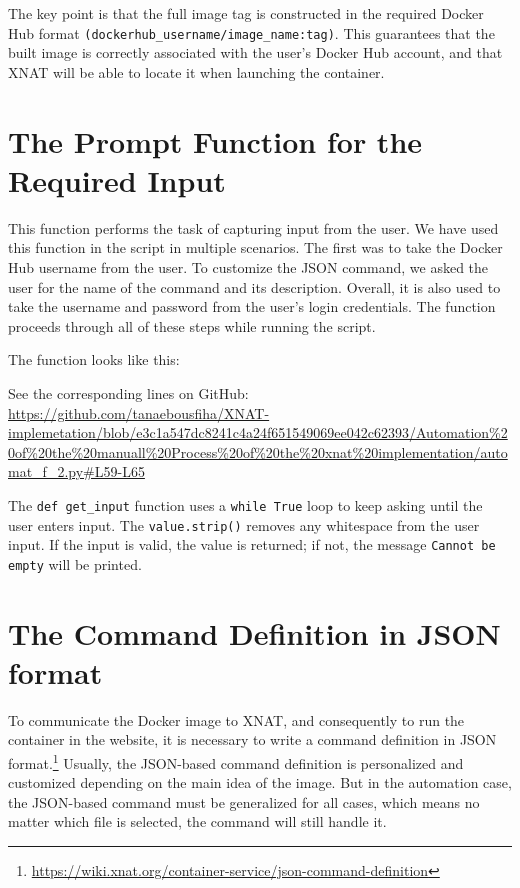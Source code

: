 The key point is that the full image tag is constructed in the required Docker Hub format \texttt{(dockerhub\_username/image\_name:tag)}. This guarantees that the built image is correctly associated with the user’s Docker Hub account, and that XNAT will be able to locate it when launching the container.

\section{The Prompt Function for the Required Input}

This function performs the task of capturing input from the user.
We have used this function in the script in multiple scenarios. The first was to take the Docker Hub username from the user. To customize the JSON command, we asked the user for the name of the command and its description. Overall, it is also used to take the username and password from the user’s login credentials. The function proceeds through all of these steps while running the script.

The function looks like this:
 


\noindent\footnotesize See the corresponding lines on GitHub:\url{ https://github.com/tanaebousfiha/XNAT-implemetation/blob/e3c1a547dc8241c4a24f651549069ee042c62393/Automation%20of%20the%20manuall%20Process%20of%20the%20xnat%20implementation/automat_f_2.py#L59-L65}


The \texttt{def get\_input} function uses a \texttt{while True} loop to keep asking until the user enters input. The \texttt{value.strip()} removes any whitespace from the user input. If the input is valid, the value is returned; if not, the message \texttt{Cannot be empty} will be printed.

\section{The Command Definition in JSON format}

To communicate the Docker image to XNAT, and consequently to run the container in the website, it is necessary to write a command definition in JSON format.\footnote{\url{ https://wiki.xnat.org/container-service/json-command-definition}}
Usually, the JSON-based command definition is personalized and customized depending on the main idea of the image. But in the automation case, the JSON-based command must be generalized for all cases, which means no matter which file is selected, the command will still handle it.

